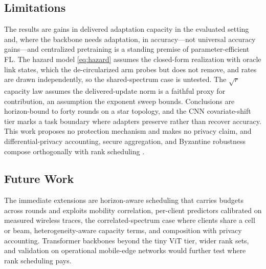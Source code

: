 \documentclass[a4paper,fleqn]{cas-dc}
\begin{document}
\subsection{Limitations}
The results are gains in delivered adaptation capacity in the evaluated setting and, where the backbone needs adaptation, in accuracy---not universal accuracy gains---and centralized pretraining is a standing premise of parameter-efficient FL. The hazard model \cref{eq:hazard} assumes the closed-form realization with oracle link states, which the de-circularized arm probes but does not remove, and rates are drawn independently, so the shared-spectrum case is untested. The $\sqrt{r}$ capacity law assumes the delivered-update norm is a faithful proxy for contribution, an assumption the exponent sweep bounds. Conclusions are horizon-bound to forty rounds on a star topology, and the CNN covariate-shift tier marks a task boundary where adapters preserve rather than recover accuracy. This work proposes no protection mechanism and makes no privacy claim, and differential-privacy accounting, secure aggregation, and Byzantine robustness compose orthogonally with rank scheduling \cite{bonawitz2017secureagg,wei2023pfl_dp}.
\par
\subsection{Future Work}
The immediate extensions are horizon-aware scheduling that carries budgets across rounds and exploits mobility correlation, per-client predictors calibrated on measured wireless traces, the correlated-spectrum case where clients share a cell or beam, heterogeneity-aware capacity terms, and composition with privacy accounting. Transformer backbones beyond the tiny ViT tier, wider rank sets, and validation on operational mobile-edge networks would further test where rank scheduling pays.
\par
\end{document}
